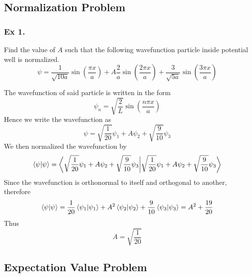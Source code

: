 \documentclass[../../../main.tex]{subfiles}
\begin{document}
\subsection{Normalization Problem}
\subsubsection{Ex 1.} Find the value of $A$ such that the following wavefunction particle inside potential well is normalized.
\begin{equation*}
    \psi=\frac{1}{\sqrt{10a}}\sin \left(\frac{\pi x}{a}\right) + A\frac{2}{a}\sin \left(\frac{2\pi x}{a}\right) + \frac{3}{\sqrt{5a}}\sin \left(\frac{3\pi x}{a}\right)
\end{equation*}

The wavefunction of said particle is written in the form 
\begin{equation*}
    \psi_n=\sqrt{\frac{2}{L}}\sin\left(\frac{n\pi x}{a}\right)
\end{equation*}
Hence we write the wavefunction as 
\begin{equation*}
    \psi=\sqrt{\frac{1}{20}}\psi_1+A\psi_2 + \sqrt{\frac{9}{10}}\psi_3
\end{equation*}
We then normalized the wavefunction by 
\begin{equation*}
    \braket{\psi|\psi}=\bigg\langle {\sqrt{\frac{1}{20}}\psi_1+A\psi_2 + \sqrt{\frac{9}{10}}\psi_3\bigg|\sqrt{\frac{1}{20}}\psi_1+A\psi_2 + \sqrt{\frac{9}{10}}\psi_3}\bigg\rangle
\end{equation*}
Since the wavefunction is orthonormal to itself and orthogonal to another, therefore 
\begin{equation*}
    \braket{\psi|\psi}=\frac{1}{20}\braket{\psi_1|\psi_1}+ A^2\braket{\psi_2|\psi_2} + \frac{9}{10}\braket{\psi_3|\psi_3}= A^2+\frac{19}{20}
\end{equation*}
Thus 
\begin{equation*}
    A=\sqrt{\frac{1}{20}}
\end{equation*}

\subsection{Expectation Value Problem}
\end{document}
